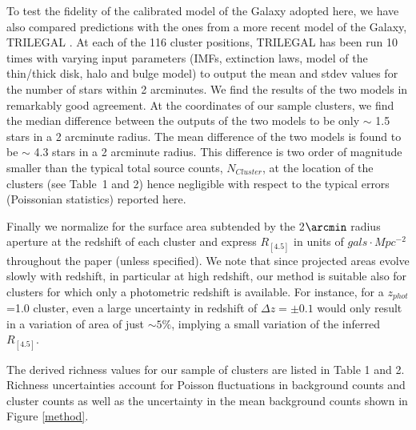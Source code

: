\documentclass[apj,twocolumn]{emulateapj}
\begin{document}
{To test the fidelity of the calibrated model of the Galaxy adopted here, we have also compared \citet{Wainscoat92}  predictions with the ones from a more recent model of the Galaxy, TRILEGAL \citep{Girardi12} .
At each of the 116 cluster positions, TRILEGAL has been run 10 times with varying input parameters (IMFs, extinction laws, model of the thin/thick disk, halo and bulge model) to output the mean and stdev values for the number of stars within 2 arcminutes. We find the results of the two models in remarkably good agreement. At the coordinates of our sample clusters, we find the median difference between the outputs of the two models to be only $\sim$ 1.5 stars in a 2 arcminute radius. The mean difference of the two models is found to be $\sim$ 4.3 stars in a 2 arcminute radius. This difference is two order of magnitude smaller than the typical total source counts, $N_{Cluster}$, at the location of the clusters (see Table~1 and 2) hence negligible with respect to the typical errors (Poissonian statistics) reported here.
 
 Finally we normalize for the surface area subtended by the 2$\arcmin$ radius aperture
at the redshift of each cluster  and express $R_{[4.5]}$ in units of $gals \cdot Mpc^{-2}$ throughout the paper (unless specified).  We note that since projected areas evolve slowly with redshift, in particular at high redshift, our method is suitable also for clusters for which only a photometric redshift is available. For instance, for a $z_{phot}$=1.0 cluster, even a large uncertainty in redshift of $\Delta z = \pm 0.1$ would only result in a variation of area of just $\sim5\%$,  implying a small variation of the inferred $R_{[4.5]}$.

The derived richness values for our sample of clusters are listed in Table 1 and 2. Richness uncertainties account for Poisson fluctuations in background counts and cluster counts as well as the uncertainty in the mean background counts shown in Figure \ref{method}. 

}
\end{document}
